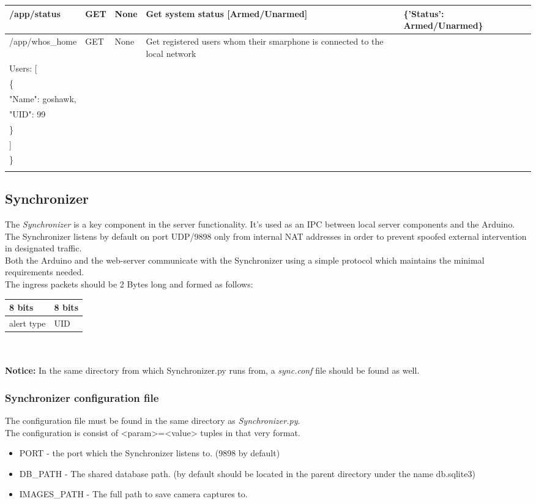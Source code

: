 \documentclass[10pt]{article}
\begin{document}
\begin{table}[ht]
{\begin{tabular}{| l | l | l | p{3cm} | p{6.5cm} | l |}
	/app/status & GET & None & Get system status [Armed/Unarmed] & \{'Status': Armed/Unarmed\} & \\ \hline
	/app/whos\_home & GET & None & Get registered users whom their smarphone is connected to the local network & \pbox{25cm}{\{ \\ 
             	\quad Users: [ \\ 
             		\qquad \{ \\ 
             			\qquad \quad "Name": goshawk, \\
             			\qquad \quad "UID": 99 \\
             			\qquad \quad \} \\
             	\qquad ] \\ 
             \quad \} \\
           } & \\ \hline
\end{tabular}}
\end{table}
\newpage
\subsection{Synchronizer}
The \emph{Synchronizer} is a key component in the server functionality. It's used as an IPC between local server components and the Arduino.
The Synchronizer listens by default on port UDP/9898 only from internal NAT addresses in order to prevent spoofed external intervention in designated traffic. \\
Both the Arduino and the web-server communicate with the Synchronizer using a simple protocol which maintains the minimal requirements needed. \\
The ingress packets should be 2 Bytes long and formed as follows: \\
\begin{tabular}{| p{5cm} | p{5cm} |}
	\hline
	\textbf{8 bits} & \textbf{8 bits} \\ \hline
	alert type & UID \\ \hline
\end{tabular}
\\ \\ \textbf{Notice:} In the same directory from which Synchronizer.py runs from, a \emph{sync.conf} file should be found as well.
\subsubsection{Synchronizer configuration file}
The configuration file must be found in the same directory as \emph{Synchronizer.py}. \\
The configuration is consist of <param>=<value> tuples in that very format.
\begin{itemize}
	\item PORT - the port which the Synchronizer listens to. (9898 by default)
	\item DB\_PATH - The shared database path. (by default should be located in the parent directory under the name db.sqlite3)
	\item IMAGES\_PATH - The full path to save camera captures to.
\end{itemize}
\newpage
\end{document}
